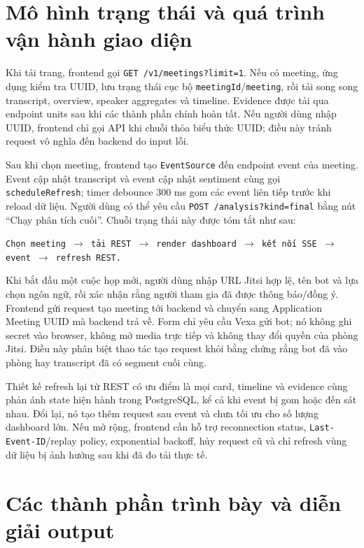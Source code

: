 \section{Mô hình trạng thái và quá trình vận hành giao diện}
Khi tải trang, frontend gọi \texttt{GET /v1/meetings?limit=1}. Nếu có meeting, ứng dụng kiểm tra UUID, lưu trạng thái cục bộ \texttt{meetingId}/\texttt{meeting}, rồi tải song song transcript, overview, speaker aggregates và timeline. Evidence được tải qua endpoint units sau khi các thành phần chính hoàn tất. Nếu người dùng nhập UUID, frontend chỉ gọi API khi chuỗi thỏa biểu thức UUID; điều này tránh request vô nghĩa đến backend do input lỗi.

Sau khi chọn meeting, frontend tạo \texttt{EventSource} đến endpoint event của meeting. Event cập nhật transcript và event cập nhật sentiment cùng gọi \texttt{scheduleRefresh}; timer debounce 300 ms gom các event liên tiếp trước khi reload dữ liệu. Người dùng có thể yêu cầu \texttt{POST /analysis?kind=final} bằng nút ``Chạy phân tích cuối''. Chuỗi trạng thái này được tóm tắt như sau:
\begin{center}
\texttt{Chọn meeting $\rightarrow$ tải REST $\rightarrow$ render dashboard $\rightarrow$ kết nối SSE $\rightarrow$ event $\rightarrow$ refresh REST.}
\end{center}

Khi bắt đầu một cuộc họp mới, người dùng nhập URL Jitsi hợp lệ, tên bot và lựa chọn ngôn ngữ, rồi xác nhận rằng người tham gia đã được thông báo/đồng ý. Frontend gửi request tạo meeting tới backend và chuyển sang Application Meeting UUID mà backend trả về. Form chỉ yêu cầu Vexa gửi bot; nó không ghi secret vào browser, không mở media trực tiếp và không thay đổi quyền của phòng Jitsi. Điều này phân biệt thao tác tạo request khỏi bằng chứng rằng bot đã vào phòng hay transcript đã có segment cuối cùng.

Thiết kế refresh lại từ REST có ưu điểm là mọi card, timeline và evidence cùng phản ánh state hiện hành trong PostgreSQL, kể cả khi event bị gom hoặc đến sát nhau. Đổi lại, nó tạo thêm request sau event và chưa tối ưu cho số lượng dashboard lớn. Nếu mở rộng, frontend cần hỗ trợ reconnection status, \texttt{Last-Event-ID}/replay policy, exponential backoff, hủy request cũ và chỉ refresh vùng dữ liệu bị ảnh hưởng sau khi đã đo tải thực tế.

\section{Các thành phần trình bày và diễn giải output}
